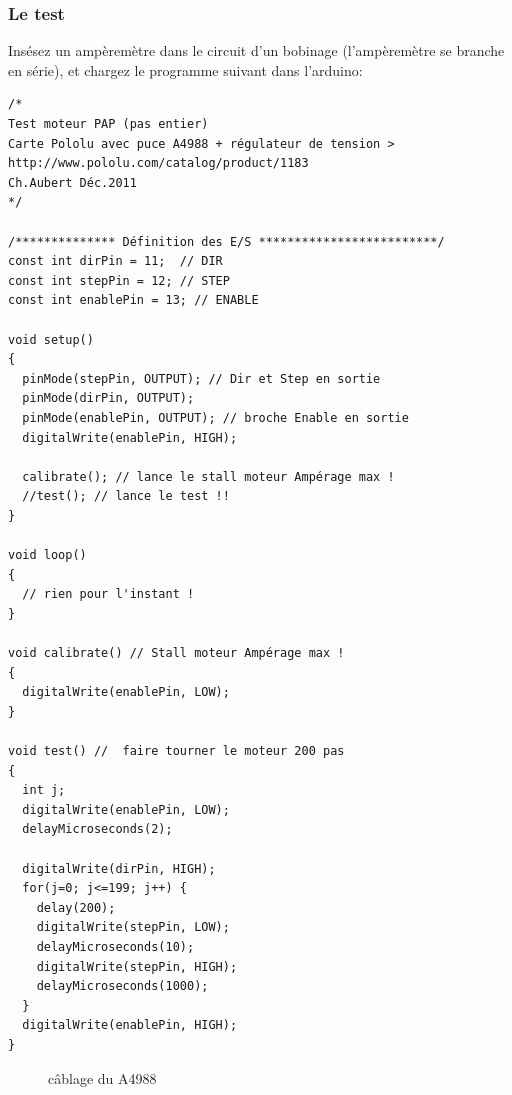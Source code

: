 \subsubsection{Le test}
Insésez un ampèremètre dans le circuit d'un bobinage (l'ampèremètre se branche en série), et chargez %
le programme suivant dans l'arduino:
\begin{verbatim}
/*
Test moteur PAP (pas entier)
Carte Pololu avec puce A4988 + régulateur de tension > 
http://www.pololu.com/catalog/product/1183
Ch.Aubert Déc.2011
*/

/************** Définition des E/S *************************/
const int dirPin = 11;  // DIR
const int stepPin = 12; // STEP
const int enablePin = 13; // ENABLE

void setup()
{
  pinMode(stepPin, OUTPUT); // Dir et Step en sortie
  pinMode(dirPin, OUTPUT);
  pinMode(enablePin, OUTPUT); // broche Enable en sortie
  digitalWrite(enablePin, HIGH);

  calibrate(); // lance le stall moteur Ampérage max !
  //test(); // lance le test !!
}

void loop()
{
  // rien pour l'instant !
}

void calibrate() // Stall moteur Ampérage max !
{
  digitalWrite(enablePin, LOW);
}

void test() //  faire tourner le moteur 200 pas
{
  int j;
  digitalWrite(enablePin, LOW);
  delayMicroseconds(2);

  digitalWrite(dirPin, HIGH);
  for(j=0; j<=199; j++) {
    delay(200);
    digitalWrite(stepPin, LOW);
    delayMicroseconds(10);
    digitalWrite(stepPin, HIGH);
    delayMicroseconds(1000);
  }
  digitalWrite(enablePin, HIGH); 
}
\end{verbatim}
\begin{figure}%
   \caption{\label{a4988_montage} câblage du A4988}%
\end{figure}%
